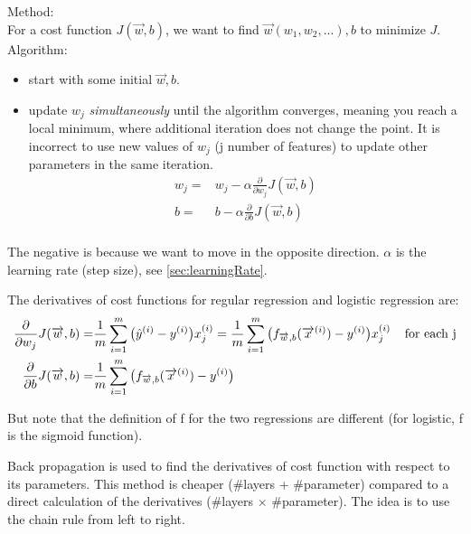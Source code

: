 \documentclass[12pt]{report}
\begin{document}
Method: \\
For a cost function $J(\overrightarrow{w},b)$,  we want to find  $ \overrightarrow{w} (w_1, w_2, ...) , b$ to minimize $J$.\\

Algorithm: \\
\begin{itemize}
\item start with some initial $\overrightarrow{w}, b$.
\item update $w_j$ \textit{simultaneously} until the algorithm converges, meaning you reach a local minimum, where additional iteration does not change the point. It is incorrect to use new values of $w_j$  (j number of features) to update other parameters in the same iteration.
\begin{equation}
\begin{split}
  w_j =& w_j - \alpha \frac{\partial}{\partial w_j} J(\overrightarrow{w},b) \\
  b =& b - \alpha \frac{\partial  }{\partial b} J(\overrightarrow{w},b) \\
\end{split}
\end{equation}
\end{itemize}

The negative is because we want to move in the opposite direction. $\alpha$ is the learning rate (step size), see \ref{sec:learningRate}.

The derivatives of cost functions for regular regression and logistic regression are:
\begin{equation}
\label{eq:derivatives}
\begin{split}
\frac{\partial}{\partial w_j} J(\overrightarrow{w},b) =& \frac{1}{m} \sum_{i=1}^{m} \big(\hat{y}^{(i)} - y^{(i)} \big) x_j^{(i)} = \frac{1}{m} \sum_{i=1}^{m} \big( f_{\overrightarrow{w},b} (\overrightarrow{x}^{(i)}) - y^{(i)} \big) x_j^{(i)} \text{\: \: for each j} \\
\frac{\partial}{\partial b} J(\overrightarrow{w},b)   =& \frac{1}{m} \sum_{i=1}^{m} \big( f_{\overrightarrow{w},b} (\overrightarrow{x}^{(i)})  - y^{(i)} \big)
\end{split}
\end{equation}

But note that the definition of f for the two regressions are different (for logistic, f is the sigmoid function).

Back propagation is used to find the derivatives of cost function with respect to its parameters. This method is cheaper (\#layers + \#parameter) compared to a direct calculation of the derivatives (\#layers $\times$ \#parameter). The idea is to use the chain rule from left to right.
\end{document}
